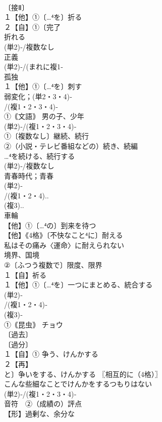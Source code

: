 \documentclass[8pt]{extreport}
\begin{document}
\begin{CJK}{UTF8}{min}
\\	〔接Ⅱ〕
\\	１【他】①〔…⁴を〕折る
\\	２【自】①〔完了
\\	折れる
\\	(単2)‐/複数なし　
\\	正義 
\\	(単2)‐/(まれに複1‐
\\	孤独 
\\	１【他】①〔…⁴を〕刺す
\\	弱変化；(単2・3・4)‐
\\	/(複1・2・3・4)‐
\\	①｟文語｠ 男の子、少年
\\	(単2)‐/(複1・2・3・4)‐
\\	①〔複数なし〕継続、続行 
\\	②（小説・テレビ番組などの）続き、続編 
\\	…⁴を続ける、続行する
\\	(単2)‐/複数なし 
\\	青春時代；青春
\\	(単2)‐
\\	/(複1・2・4)..
\\	(複3)..
\\	車輪 
\\	【他】①〔…⁴の〕到来を待つ
\\	【他】《4格》〔不快なこと⁴に〕耐える
\\	私はその痛み〈運命〉に耐えられない 
\\	境界、国境 
\\	②〔ふつう複数で〕限度、限界
\\	１【自】祈る 
\\	１【他】①〔…⁴を〕一つにまとめる、統合する
\\	(単2)‐
\\	/(複1・2・4)‐
\\	(複3)‐
\\	①｟昆虫｠ チョウ 
\\	〔過去〕
\\	〔過分〕
\\	１【自】① 争う、けんかする 
\\	２【再】
\\	と〕争いをする、けんかする 〖相互的に（4格）〗
\\	こんな些細なことでけんかをするつもりはない
\\	(単2)‐/(複1・2・3・4)‐
\\	音符　②（成績の）評点
\\	【形】過剰な、余分な

\end{CJK}
\end{document}

